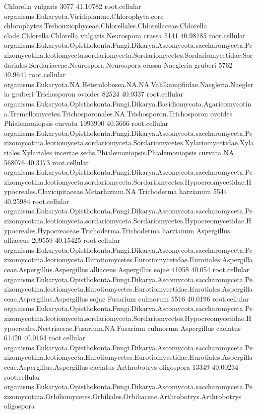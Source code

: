 \documentclass{article}
\begin{document}
\begin{Schunk}
\begin{Soutput}
 Chlorella vulgaris 		 3077 41.10782 	 root.cellular organisms.Eukaryota.Viridiplantae.Chlorophyta.core chlorophytes.Trebouxiophyceae.Chlorellales.Chlorellaceae.Chlorella clade.Chlorella.Chlorella vulgaris
 Neurospora crassa 		 5141 40.98185 	 root.cellular organisms.Eukaryota.Opisthokonta.Fungi.Dikarya.Ascomycota.saccharomyceta.Pezizomycotina.leotiomyceta.sordariomyceta.Sordariomycetes.Sordariomycetidae.Sordariales.Sordariaceae.Neurospora.Neurospora crassa
 Naegleria gruberi 		 5762 40.9641 	 root.cellular organisms.Eukaryota.NA.Heterolobosea.NA.NA.Vahlkampfiidae.Naegleria.Naegleria gruberi
 Trichosporon ovoides 		 82524 40.9337 	 root.cellular organisms.Eukaryota.Opisthokonta.Fungi.Dikarya.Basidiomycota.Agaricomycotina.Tremellomycetes.Trichosporonales.NA.Trichosporon.Trichosporon ovoides
 Phialemoniopsis curvata 		 1093900 40.3666 	 root.cellular organisms.Eukaryota.Opisthokonta.Fungi.Dikarya.Ascomycota.saccharomyceta.Pezizomycotina.leotiomyceta.sordariomyceta.Sordariomycetes.Xylariomycetidae.Xylariales.Xylariales incertae sedis.Phialemoniopsis.Phialemoniopsis curvata
 NA 		 568076 40.3173 	 root.cellular organisms.Eukaryota.Opisthokonta.Fungi.Dikarya.Ascomycota.saccharomyceta.Pezizomycotina.leotiomyceta.sordariomyceta.Sordariomycetes.Hypocreomycetidae.Hypocreales.Clavicipitaceae.Metarhizium.NA
 Trichoderma harzianum 		 5544 40.25984 	 root.cellular organisms.Eukaryota.Opisthokonta.Fungi.Dikarya.Ascomycota.saccharomyceta.Pezizomycotina.leotiomyceta.sordariomyceta.Sordariomycetes.Hypocreomycetidae.Hypocreales.Hypocreaceae.Trichoderma.Trichoderma harzianum
 Aspergillus alliaceus 		 209559 40.15425 	 root.cellular organisms.Eukaryota.Opisthokonta.Fungi.Dikarya.Ascomycota.saccharomyceta.Pezizomycotina.leotiomyceta.Eurotiomycetes.Eurotiomycetidae.Eurotiales.Aspergillaceae.Aspergillus.Aspergillus alliaceus
 Aspergillus sojae 		 41058 40.054 	 root.cellular organisms.Eukaryota.Opisthokonta.Fungi.Dikarya.Ascomycota.saccharomyceta.Pezizomycotina.leotiomyceta.Eurotiomycetes.Eurotiomycetidae.Eurotiales.Aspergillaceae.Aspergillus.Aspergillus sojae
 Fusarium culmorum 		 5516 40.0196 	 root.cellular organisms.Eukaryota.Opisthokonta.Fungi.Dikarya.Ascomycota.saccharomyceta.Pezizomycotina.leotiomyceta.sordariomyceta.Sordariomycetes.Hypocreomycetidae.Hypocreales.Nectriaceae.Fusarium.NA.Fusarium culmorum
 Aspergillus caelatus 		 61420 40.0164 	 root.cellular organisms.Eukaryota.Opisthokonta.Fungi.Dikarya.Ascomycota.saccharomyceta.Pezizomycotina.leotiomyceta.Eurotiomycetes.Eurotiomycetidae.Eurotiales.Aspergillaceae.Aspergillus.Aspergillus caelatus
 Arthrobotrys oligospora 		 13349 40.00234 	 root.cellular organisms.Eukaryota.Opisthokonta.Fungi.Dikarya.Ascomycota.saccharomyceta.Pezizomycotina.Orbiliomycetes.Orbiliales.Orbiliaceae.Arthrobotrys.Arthrobotrys oligospora

\end{Soutput}
\end{Schunk}
\end{document}

